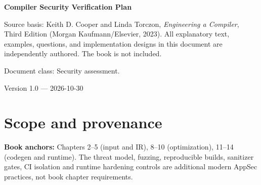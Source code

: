 \documentclass[10pt,letterpaper]{article}
\begin{document}
\begin{titlepage}
\centering\vspace*{1.0in}
{\Huge\bfseries\textcolor{CompilerBlue}{Compiler Security Verification Plan}\par}
\vspace{.22in}{\Large Negative inputs, fuzzing and fail-closed controls\par}
\vspace{.4in}{\large Compiler Engineering Documentation Suite\par}
\vfill
\begin{minipage}{.86\linewidth}\small
Source basis: Keith D. Cooper and Linda Torczon, \emph{Engineering a Compiler}, Third Edition (Morgan Kaufmann/Elsevier, 2023). All explanatory text, examples, questions, and implementation designs in this document are independently authored. The book is not included.\par\medskip
Document class: Security assessment.
\end{minipage}
\vfill\textcolor{CompilerGray}{Version 1.0 --- 2026-10-30}\par
\end{titlepage}
\tableofcontents\clearpage
\section{Scope and provenance}
\textbf{Book anchors:} Chapters 2--5 (input and IR), 8--10 (optimization), 11--14 (codegen and runtime). \modern The threat model, fuzzing, reproducible builds, sanitizer gates, CI isolation and runtime hardening controls are additional modern AppSec practices, not book chapter requirements.\par
\end{document}
